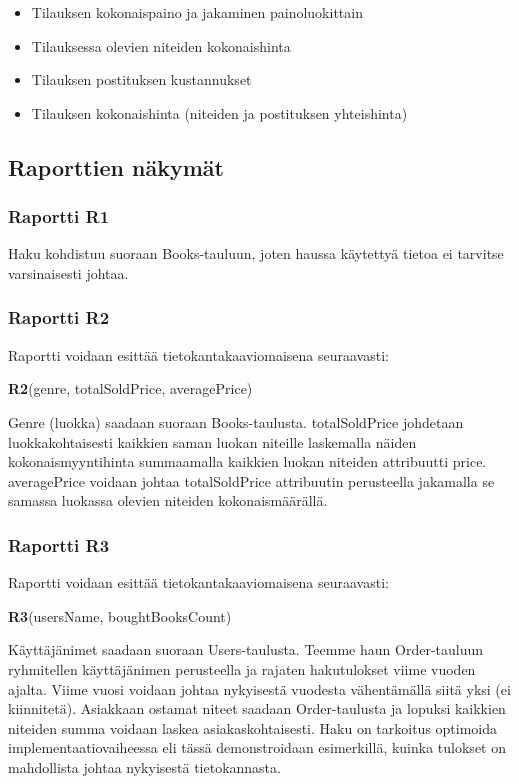 \documentclass[11pt,a4paper]{article}
\begin{document}
\begin{itemize}
	\item Tilauksen kokonaispaino ja jakaminen painoluokittain
	\item Tilauksessa olevien niteiden kokonaishinta
	\item Tilauksen postituksen kustannukset
	\item Tilauksen kokonaishinta (niteiden ja postituksen yhteishinta)
\end{itemize}

\subsection{Raporttien näkymät}

\subsubsection{Raportti R1}

Haku kohdistuu suoraan Books-tauluun, joten haussa käytettyä tietoa ei tarvitse varsinaisesti johtaa.

\subsubsection{Raportti R2}

Raportti voidaan esittää tietokantakaaviomaisena seuraavasti:

\textbf{R2}(genre, totalSoldPrice, averagePrice)

Genre (luokka) saadaan suoraan Books-taulusta. totalSoldPrice johdetaan luokkakohtaisesti kaikkien saman luokan niteille laskemalla näiden kokonaismyyntihinta summaamalla kaikkien luokan niteiden attribuutti price. averagePrice voidaan johtaa totalSoldPrice attribuutin perusteella jakamalla se samassa luokassa olevien niteiden kokonaismäärällä.

\subsubsection{Raportti R3}

Raportti voidaan esittää tietokantakaaviomaisena seuraavasti:

\textbf{R3}(usersName, boughtBooksCount)

Käyttäjänimet saadaan suoraan Users-taulusta. Teemme haun Order-tauluun ryhmitellen käyttäjänimen perusteella ja rajaten hakutulokset viime vuoden ajalta. Viime vuosi voidaan johtaa nykyisestä vuodesta vähentämällä siitä yksi (ei kiinnitetä). Asiakkaan ostamat niteet saadaan Order-taulusta ja lopuksi kaikkien niteiden summa voidaan laskea asiakaskohtaisesti. Haku on tarkoitus optimoida implementaatiovaiheessa eli tässä demonstroidaan esimerkillä, kuinka tulokset on mahdollista johtaa nykyisestä tietokannasta.
\end{document}
